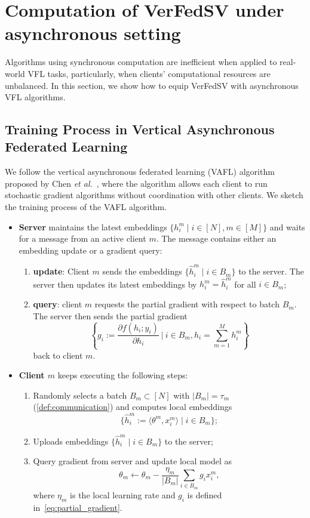 \section{Computation of VerFedSV under asynchronous setting} \label{sec:8-6}
Algorithms using synchronous computation are inefficient when applied to real-world VFL tasks, particularly, when clients' computational resources are unbalanced. In this section, we show how to equip VerFedSV with asynchronous VFL algorithms.

\subsection{Training Process in Vertical Asynchronous Federated Learning}
We follow the vertical asynchronous federated learning (VAFL) algorithm proposed by Chen \textit{et al.}~\cite{chen2020vafl}, where the algorithm allows each client to run stochastic gradient algorithms without coordination with other clients. We sketch the training process of the VAFL algorithm. 
\begin{itemize}
\item \textbf{Server} maintains the latest embeddings $\{h_i^m \mid i \in [N], m \in [M]\}$ and waits for a message from an active client $m$. The message contains either an embedding update or a gradient query:
\begin{enumerate}
  \item \textbf{update}: Client $m$ sends the embeddings $\{\hat h_i^m \mid i \in B_m\}$ to the server. The server then updates its latest embeddings by $h_i^m = \hat h_i^m$ for all  $i \in B_m$;
  \item \textbf{query}: client $m$ requests the partial gradient with respect to batch $B_m$. The server then sends the partial gradient
  \begin{equation} \label{eq:partial_gradient}
      \left\{ g_i := \frac{\partial f(h_i; y_i)}{\partial h_i} ~\bigg\vert~ i \in B_m, h_i = \sum_{m=1}^M h_i^m \right\}
  \end{equation}
  back to client $m$. 
\end{enumerate}
\item \textbf{Client $m$} keeps executing the following steps:
\begin{enumerate}
  \item Randomly selects a batch $B_m \subset [N]$ with $|B_m| = \tau_m$ (\autoref{def:communication}) and computes local embeddings 
  \[\{\hat h_i^m := \langle \theta^m, x^m_i \rangle \mid i \in B_m\};\]
  \item Uploads embeddings $\{\hat h_i^m \mid i \in B_m\}$ to the server;
  \item Query gradient from server and update local model as
  \[\theta_m \leftarrow \theta_m -  \frac{\eta_m}{|B_m|}\sum_{i\in B_m} g_i x_i^m,\]
  where $\eta_m$ is the local learning rate and $g_i$ is defined in~\eqref{eq:partial_gradient}. 
\end{enumerate}
\end{itemize} 

